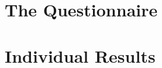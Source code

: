 \documentclass[
pdfa=false,  %
color=9c,
logo=body,
class=article,
marginpar=false,
logofile=../logos/tuda_logo.pdf
]{tudapub}
\begin{document}
\newpage
\begin{appendices}
	\section{The Questionnaire}
		\label{appendix:questionnaire}
		
	\newpage
	\section{Individual Results}
		\label{appendix:individual_results}
		
\end{appendices}
\end{document}
